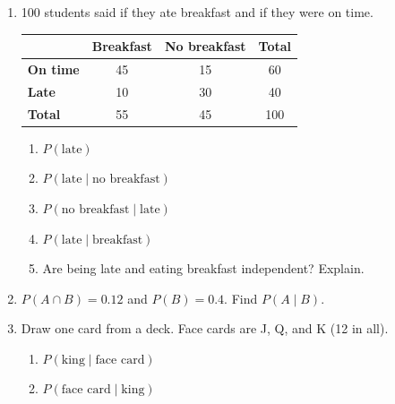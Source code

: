 \documentclass[11pt]{article}
\begin{document}
\newpage
\begin{enumerate}

\item 100 students said if they ate breakfast and if they were on time.

\begin{center}
\renewcommand{\arraystretch}{1.4}
\begin{tabular}{|l|c|c|c|}\hline
 & \textbf{Breakfast} & \textbf{No breakfast} & \textbf{Total} \\ \hline
\textbf{On time} & 45 & 15 & 60 \\ \hline
\textbf{Late} & 10 & 30 & 40 \\ \hline
\textbf{Total} & 55 & 45 & 100 \\ \hline
\end{tabular}
\end{center}
\begin{enumerate}[itemsep=1.4em]
  \item $P(\text{late})$ 
  \item $P(\text{late} \mid \text{no breakfast})$ 
  \item $P(\text{no breakfast} \mid \text{late})$ 
  \item $P(\text{late} \mid \text{breakfast})$ 
  \item Are being late and eating breakfast independent? Explain.

\end{enumerate}
\work{4em}

\item $P(A \cap B) = 0.12$ and $P(B) = 0.4$. Find $P(A \mid B)$.

\work{2.5em}

\item Draw one card from a deck. Face cards are J, Q, and K (12 in all).
\begin{enumerate}[itemsep=1.4em]
  \item $P(\text{king} \mid \text{face card})$ 
  \item $P(\text{face card} \mid \text{king})$ 
\end{enumerate}


\end{enumerate}
\end{document}
